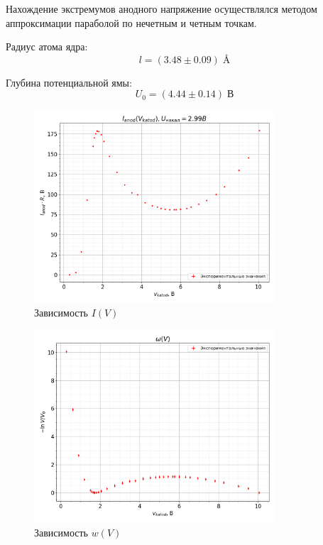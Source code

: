 \documentclass[a4paper,12pt]{article} %
\begin{document}
Нахождение экстремумов анодного напряжение осуществлялся методом аппроксимации параболой по нечетным и четным точкам.


Радиус атома ядра:
$$
    l = (3.48 \pm 0.09) \; \si{\angstrom}
$$

Глубина потенциальной ямы:
$$
    U_0 = (4.44 \pm 0.14) \; \text{В}
$$

\begin{figure}[h!]
    \begin{center}
    \includegraphics[width = 0.8\textwidth]{I(V).png}
    \caption{Зависимость $I(V)$}
    \end{center}
\end{figure}

\begin{figure}[h!]
    \begin{center}
    \includegraphics[width = 0.8\textwidth]{w(V).png}
    \caption{Зависимость $w(V)$}
    \end{center}
\end{figure}
\end{document}
